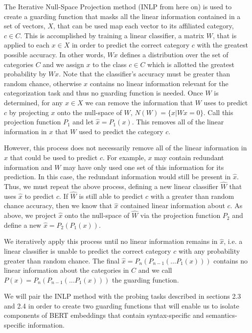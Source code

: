 \documentclass[11pt,a4paper]{article}
\begin{document}
The Iterative Null-Space Projection method (INLP from here on) is used to create a guarding function that masks all the linear information contained in a set of vectors, $X$, that can be used map each vector to its affiliated category, $c \in C$. This is accomplished by training a linear classifier, a matrix $W$, that is applied to each $x \in X$ in order to predict the correct category $c$ with the greatest possible accuracy. In other words, $Wx$ defines a distribution over the set of categories $C$ and we assign $x$ to the class $c \in C$ which is allotted the greatest probability by $Wx$. Note that the classifier's accuracy must be greater than random chance, otherwise $x$ contains no linear information relevant for the categorization task and thus no guarding function is needed. Once $W$ is determined, for any $x \in X$ we can remove the information that $W$ uses to predict $c$ by projecting $x$ onto the null-space of $W$, $N(W) = \{x | Wx=0\}$. Call this projection function $P_1$ and let $\hat{x} = P_1(x)$. This removes all of the linear information in $x$ that $W$ used to predict the category $c$. 

However, this process does not necessarily remove all of the linear information in $x$ that could be used to predict $c$. For example, $x$ may contain redundant information and $W$ may have only used one set of this information for its prediction. In this case, the redundant information would still be present in $\hat{x}$. Thus, we must repeat the above process, defining a new linear classifier $\hat{W}$ that uses $\hat{x}$  to predict $c$. If $\hat{W}$ is still able to predict $c$ with a greater than random chance accuracy, then we know that $\hat{x}$ contained linear information about $c$. As above, we project $\hat{x}$ onto the null-space of $\hat{W}$ via the projection function $P_2$ and define a new $\hat{x} = P_2(P_1(x))$.

We iteratively apply this process until no linear information remains in $\hat{x}$, i.e. a linear classifier is unable to predict the correct category $c$ with any probability greater than random chance. The final $\hat{x} = P_n(P_{n-1}(\dots P_1(x)))$ contains no linear information about the categories in $C$ and we call $P(x) = P_n(P_{n-1}(\dots P_1(x)))$ the guarding function. 

We will pair the INLP method with the probing tasks described in sections 2.3 and 2.4 in order to create two guarding functions that will enable us to isolate components of BERT embeddings that contain syntax-specific and semantics-specific information. 
\end{document}
